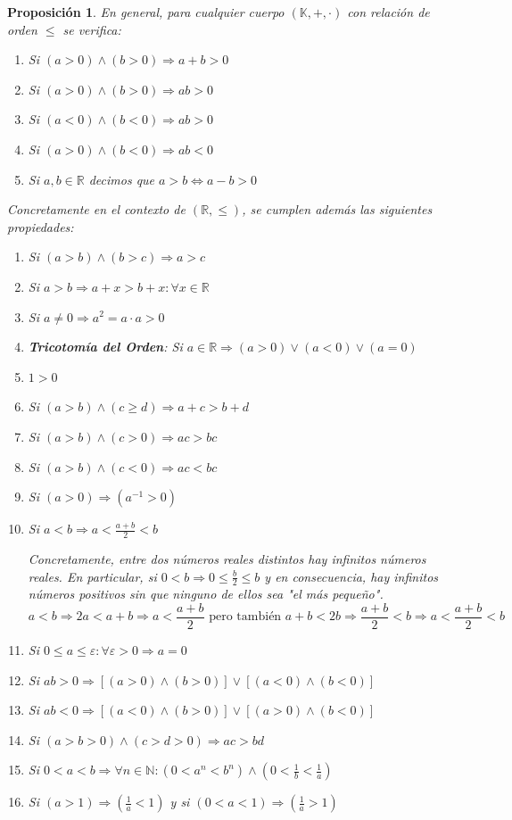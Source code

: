\documentclass[10pt,a4paper,openright]{book}
\theoremstyle{break}
\newtheorem*{prop}{Proposición}
\begin{document}
\begin{prop}
En general, para cualquier cuerpo $(\mathbb K, +, \cdot)$ con relación de orden $\leq$ se verifica:
\begin{enumerate}
\item Si $(a>0) \wedge (b>0)\Rightarrow a+b>0$
\item Si $(a>0)\wedge (b>0)\Rightarrow ab>0$
\item Si $(a<0)\wedge (b<0)\Rightarrow ab>0$
\item Si $(a>0)\wedge (b<0)\Rightarrow ab<0$
\item Si $a,b\in \mathbb R$ decimos que $a>b\Leftrightarrow a-b>0$
\end{enumerate}
Concretamente en el contexto de $(\mathbb R, \leq)$, se cumplen además las siguientes propiedades:
\begin{enumerate}
\item Si $(a>b)\wedge (b>c)\Rightarrow a>c$
\item Si $a>b\Rightarrow a+x>b+x: \forall x\in \mathbb R$
\item Si $a\neq 0\Rightarrow a^2=a\cdot a>0$
\item \textbf{Tricotomía del Orden}: Si $a\in \mathbb R\Rightarrow (a>0)\vee (a<0)\vee (a=0)$
\item $1>0$
\item Si $(a>b) \wedge (c\geq d)\Rightarrow a+c>b+d$
\item Si $(a>b) \wedge (c>0)\Rightarrow ac>bc$
\item Si $(a>b)\wedge (c<0)\Rightarrow ac<bc$
\item Si $(a>0)\Rightarrow (a^{-1}>0)$
\item Si $a<b\Rightarrow a<\frac{a+b}{2}<b$\par
Concretamente, entre dos números reales distintos hay infinitos números reales. En particular, si $0<b\Rightarrow 0\leq \frac{b}{2}\leq b$ y en consecuencia, hay infinitos números positivos sin que ninguno de ellos sea "el más pequeño".
$$a<b\Rightarrow 2a<a+b \Rightarrow a<\frac{a+b}{2}\mbox{ pero también }a+b<2b\Rightarrow \frac{a+b}{2}<b \Rightarrow a<\frac{a+b}{2}<b$$
\item Si $0\leq a\leq \varepsilon: \forall \varepsilon>0 \Rightarrow a=0$
\item Si $ab>0\Rightarrow [(a>0)\wedge (b>0)]\vee [(a<0)\wedge (b<0)]$
\item Si $ab<0\Rightarrow [(a<0)\wedge (b>0)]\vee [(a>0)\wedge (b<0)]$
\item Si $(a>b>0)\wedge (c>d>0)\Rightarrow ac>bd$
\item Si $0<a<b\Rightarrow \forall n \in \mathbb N : (0<a^n<b^n)\wedge (0<\frac{1}{b}<\frac{1}{a})$
\item Si $(a>1)\Rightarrow (\frac{1}{a}<1)$ y si $(0<a<1)\Rightarrow (\frac{1}{a}>1)$
\end{enumerate}
\end{prop}
\end{document}
